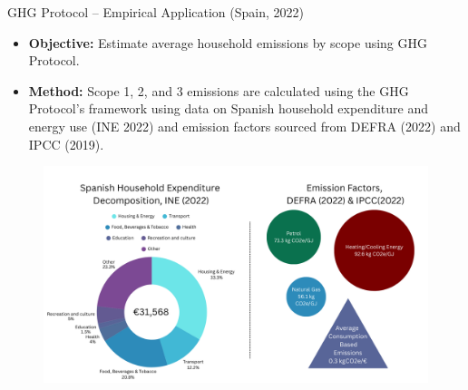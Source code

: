 \documentclass{beamer}
\begin{document}
\begin{frame}{GHG Protocol – Empirical Application (Spain, 2022)}
\vspace{-2.5em}
  \footnotesize
  \begin{itemize}
\item \textbf{Objective:} Estimate average household emissions by scope using GHG Protocol.\\

\pause
\item \textbf{Method: }Scope 1, 2, and 3 emissions are calculated using the GHG Protocol's framework using data on Spanish household expenditure and energy use (INE 2022) and emission factors sourced from DEFRA (2022) and IPCC (2019).\\
  \end{itemize}
\pause
\vspace{-0.5em}
\begin{figure}
\centering
\includegraphics[width=0.8\linewidth]{Spanish Data Visual.png}
\end{figure}



\end{frame}
\end{document}
